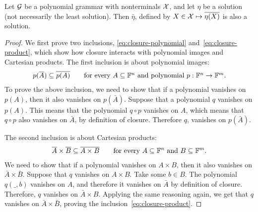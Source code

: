 \begin{lemma}\label{lem:closed-valuation}
  Let $\mathcal{G}$ be a polynomial grammar with nonterminals $\mathcal{X}$, and let $\eta$ be a solution (not necessarily the least solution). Then $\bar \eta$, defined by $X \in \mathcal{X} \mapsto \overline {\eta(X)}$ is also a solution.
	\end{lemma}
\begin{proof}
	We first prove two inclusions, \eqref{eq:closure-polynomial} and~\eqref{eq:closure-product}, which show how closure interacts with polynomial images and Cartesian products. The first inclusion is about polynomial images:
\begin{align}\label{eq:closure-polynomial}
	 p(\overline{A}) \subseteq \overline{p(A)} \qquad \mbox{for every $A \subseteq \mathbb F^n$ and polynomial $p: \mathbb F^n \to \mathbb F^m$}.
\end{align}
To prove the above inclusion, we need to show that if a polynomial vanishes on $p(A)$, then it also vanishes on $p(\bar A)$. Suppose that a polynomial $q$ vanishes on $p(A)$. This means that the polynomial $q \circ p$ vanishes on $A$, which means that $q \circ p$ also vanishes on $\bar A$, by definition of closure. Therefore $q$, vanishes on $p(\bar A)$.

The second inclusion is about Cartesian products:
\begin{align}\label{eq:closure-product}
  \overline{A} \times \overline{B} \subseteq \overline{A \times B} \qquad \text{for every $A \subseteq \mathbb F^n$ and $B \subseteq \mathbb F^m$.}
\end{align}
We need to show that if a polynomial vanishes on $A \times B$, then it also vanishes on $\bar A \times  \bar B$. Suppose that $q$ vanishes on $A \times B$. Take some $b \in B$. The polynomial $q(\_,b)$ vanishes on $A$, and therefore it vanishes on $\bar A$ by definition of closure. Therefore,  $q$ vanishes on $\bar A \times B$. Applying the same reasoning again, we get that $q$ vanishes on $\bar A \times \bar B$, proving the inclusion~\eqref{eq:closure-product}. 


\end{proof}
